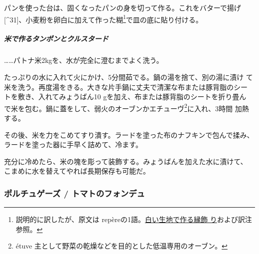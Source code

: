 \begin{recette}
パンを使った台は、固くなったパンの身を切って作る。これをバターで揚げ
{[}\^{}31{]}、小麦粉を卵白に加えて作った糊\footnote{説明的に訳したが、原文は
  repèreの1語。\protect\hyperlink{bordures-en-pate-blanche}{白い生地で作る縁飾
  り}および訳注参照。}で皿の底に貼り付ける。

\hypertarget{ux7c73ux3067ux4f5cux308bux30bfux30f3ux30ddux30f3ux3068ux30afux30ebux30b9ux30bfux30fcux30c9}{%
\subparagraph{米で作るタンポンとクルスタード}\label{ux7c73ux3067ux4f5cux308bux30bfux30f3ux30ddux30f3ux3068ux30afux30ebux30b9ux30bfux30fcux30c9}}

\ldots{}\ldots{}パトナ米2kgを、水が完全に澄むまでよく洗う。

たっぷりの水に入れて火にかけ、5分間茹でる。鍋の湯を捨て、別の湯に漬け
て米を洗う。再度湯をきる。大きな片手鍋に丈夫で清潔な布または豚背脂のシー
トを敷き、入れてみょうばん10 gを加え、布または豚背脂のシートを折り畳ん
で米を包む。鍋に蓋をして、弱火のオーブンかエチューヴ\footnote{étuve
  主として野菜の乾燥などを目的とした低温専用のオーブン。}に入れ、3時間
加熱する。

その後、米を力をこめてすり潰す。ラードを塗った布のナフキンで包んで揉み、
ラードを塗った器に手早く詰めて、冷ます。

充分に冷めたら、米の塊を彫って装飾する。みょうばんを加えた水に漬けて、
こまめに水を替えてやれば長期保存も可能だ。

\maeaki

\hypertarget{portugaise}{%
\subsubsection{ポルチュゲーズ / トマトのフォンデュ}\label{portugaise}}


\end{recette}
